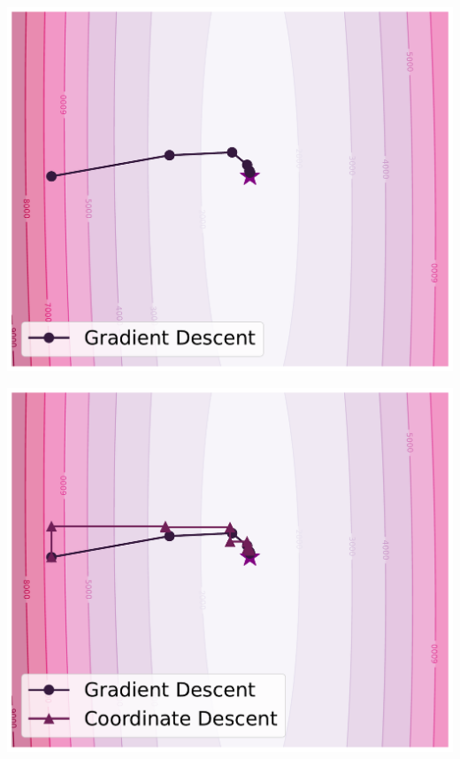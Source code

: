 \documentclass{beamer}
\begin{document}
\hspace{-3.3em}
\begin{frame}
  \vspace{-1.8em}
  \includegraphics[width=1.17\textwidth]{example_1_nopriv.pdf}
  \addtocounter{framenumber}{-1}
\end{frame}

\hspace{-3.3em}
\begin{frame}
  \vspace{-1.8em}
  \includegraphics[width=1.17\textwidth]{example_2_nopriv.pdf}
  \addtocounter{framenumber}{-1}
\end{frame}
\end{document}
